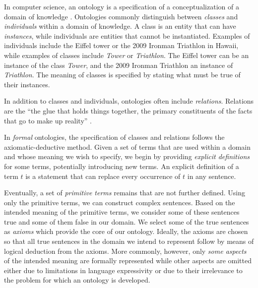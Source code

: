 \documentclass{bioinfo}
\renewcommand{\cite}{\citep}
\begin{document}
In computer science, an ontology is a specification of a
conceptualization of a domain of knowledge \cite{Gruber1995,
  Guarino1998}.  %
Ontologies commonly distinguish between {\em classes} and {\em
  individuals} within a domain of knowledge. A class is an entity that
can have {\em instances}, while individuals are entities that cannot
be instantiated. Examples of individuals include the Eiffel tower or
the 2009 Ironman Triathlon in Hawaii, while examples of classes
include {\em Tower} or {\em Triathlon}. The Eiffel tower can be an
instance of the class {\em Tower}, and the 2009 Ironman Triathlon an
instance of {\em Triathlon}.  The meaning of classes is specified by
stating what must be true of their instances.

In addition to classes and individuals, ontologies often include {\em
  relations}. Relations are the ``the glue that holds things together,
the primary constituents of the facts that go to make up reality''
\cite{}.

In {\em formal} ontologies, the specification of classes and relations
follows the axiomatic-deductive method. Given a set of terms that are
used within a domain and whose meaning we wish to specify, we begin by
providing {\em explicit definitions} for some terms, potentially
introducing new terms. An explicit definition of a term $t$ is a
statement that can replace every occurrence of $t$ in any sentence.

Eventually, a set of {\em primitive terms} remains that are not
further defined. Using only the primitive terms, we can construct
complex sentences. Based on the intended meaning of the primitive
terms, we consider some of these sentences true and some of them false
in our domain. We select some of the true sentences as {\em axioms}
which provide the core of our ontology. Ideally, the axioms are chosen
so that all true sentences in the domain we intend to represent follow
by means of logical deduction from the axioms. More commonly, however,
only {\em some aspects} of the intended meaning are formally
represented while other aspects are omitted either due to limitations
in language expressivity or due to their irrelevance to the problem
for which an ontology is developed.
\end{document}
